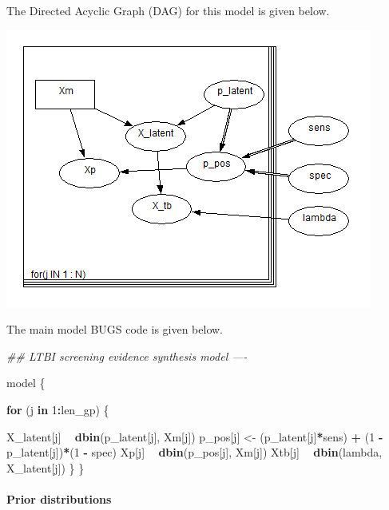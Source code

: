\documentclass[]{article}
\newenvironment{Shaded}{\begin{snugshade}}{\end{snugshade}}
\newcommand{\CommentTok}[1]{\textcolor[rgb]{0.56,0.35,0.01}{\textit{#1}}}
\newcommand{\ControlFlowTok}[1]{\textcolor[rgb]{0.13,0.29,0.53}{\textbf{#1}}}
\newcommand{\DecValTok}[1]{\textcolor[rgb]{0.00,0.00,0.81}{#1}}
\newcommand{\KeywordTok}[1]{\textcolor[rgb]{0.13,0.29,0.53}{\textbf{#1}}}
\newcommand{\NormalTok}[1]{#1}
\newcommand{\OperatorTok}[1]{\textcolor[rgb]{0.81,0.36,0.00}{\textbf{#1}}}
\newcommand{\StringTok}[1]{\textcolor[rgb]{0.31,0.60,0.02}{#1}}
\let\oldparagraph\paragraph
\renewcommand{\paragraph}[1]{\oldparagraph{#1}\mbox{}}
\begin{document}
The Directed Acyclic Graph (DAG) for this model is given below.

\includegraphics{DAG-time-independent.PNG}

The main model BUGS code is given below.

\begin{Shaded}
\begin{Highlighting}[]
\CommentTok{## LTBI screening evidence synthesis model ----}

\NormalTok{model \{}

  \ControlFlowTok{for}\NormalTok{ (j }\ControlFlowTok{in} \DecValTok{1}\OperatorTok{:}\NormalTok{len_gp) \{}

\NormalTok{      X_latent[j] }\OperatorTok{~}\StringTok{ }\KeywordTok{dbin}\NormalTok{(p_latent[j], Xm[j])}
\NormalTok{      p_pos[j] <-}\StringTok{ }\NormalTok{(p_latent[j]}\OperatorTok{*}\NormalTok{sens) }\OperatorTok{+}\StringTok{ }\NormalTok{(}\DecValTok{1} \OperatorTok{-}\StringTok{ }\NormalTok{p_latent[j])}\OperatorTok{*}\NormalTok{(}\DecValTok{1} \OperatorTok{-}\StringTok{ }\NormalTok{spec)}
\NormalTok{      Xp[j] }\OperatorTok{~}\StringTok{ }\KeywordTok{dbin}\NormalTok{(p_pos[j], Xm[j])}
\NormalTok{      Xtb[j] }\OperatorTok{~}\StringTok{ }\KeywordTok{dbin}\NormalTok{(lambda, X_latent[j])}
\NormalTok{    \}}
\NormalTok{\}}
\end{Highlighting}
\end{Shaded}

\hypertarget{prior-distributions}{%
\paragraph{Prior distributions}\label{prior-distributions}}
\end{document}
